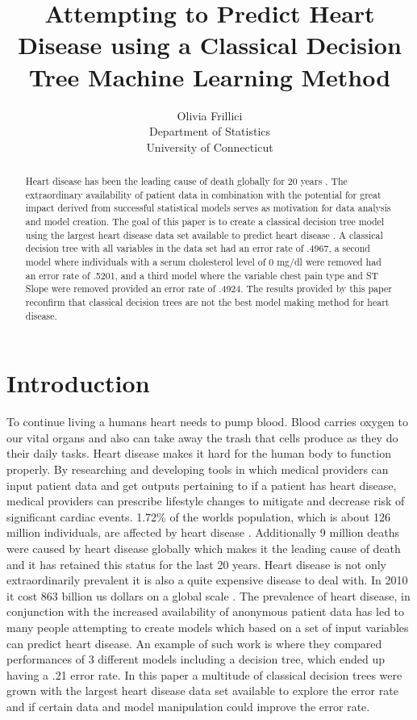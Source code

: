 \documentclass[12pt]{article}
\title{Attempting to Predict Heart Disease using a Classical Decision Tree Machine Learning Method }
\author{Olivia Frillici\\
  Department of Statistics\\
  University of Connecticut
}
\begin{document}
\maketitle
\begin{abstract}
  Heart disease has been the leading cause of death globally for 20 years \citep*{khan2020global}. The extraordinary availability of patient data in combination with the potential for great impact derived from successful statistical models serves as motivation for data analysis and model creation. The goal of this paper is to create a classical decision tree model using the largest heart disease data set available to predict heart disease \citep*{CitekeyMisc}. A classical decision tree with all variables in the data set had an error rate of .4967, a second model where individuals with a serum cholesterol level of 0 mg/dl were removed had an error rate of .5201, and a third model where the variable chest pain type and ST Slope were removed provided an error rate of .4924. The results provided by this paper reconfirm that classical decision trees are not the best model making method for heart disease. 
    \end{abstract}

  
  \newpage  
    
    \section{Introduction}
    \label{sec:intro}
    
    To continue living a human\textsc{}s heart needs to pump blood. Blood carries oxygen to our vital organs and also can take away the trash that cells produce as they do their daily tasks. Heart disease makes it hard for the human body to function properly. By researching and developing tools in which medical providers can input patient data and get outputs pertaining to if a patient has heart disease, medical providers can prescribe lifestyle changes to mitigate and decrease risk of significant cardiac events. 
1.72\% of the world\textsc{}s population, which is about 126 million individuals, are affected by heart disease \citep*{khan2020global}. Additionally 9 million deaths were caused by heart disease globally which makes it the leading cause of death and it has retained this status for the last 20 years\citep*{khan2020global}. Heart disease is not only extraordinarily prevalent it is also a quite expensive disease to deal with. In 2010 it cost 863 billion us dollars on a global scale \citep*{khan2020global}. 
The prevalence of heart disease, in conjunction with the increased availability of anonymous patient data has led to many people attempting to create models which based on a set of input variables can predict heart disease. An example of such work is \citet*{5643666} where they compared performances of 3 different models including a decision tree, which ended up having a .21 error rate. 
In this paper a multitude of classical decision trees were grown with the largest heart disease data set available to explore the error rate and if certain data and model manipulation could improve the error rate.\par 
\end{document}
